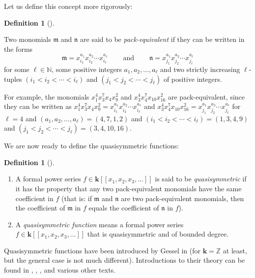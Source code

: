 \documentclass[numbers=enddot,12pt,final,onecolumn,notitlepage]{scrartcl}%
\theoremstyle{definition}
\newtheorem{defi}[theo]{Definition}
\newenvironment{definition}[1][]
{\begin{defi}[#1]\begin{leftbar}}
{\end{leftbar}\end{defi}}
\begin{document}
Let us define this concept more rigorously:

\begin{definition}
Two monomials $\mathfrak{m}$ and $\mathfrak{n}$ are said to be
\emph{pack-equivalent} if they can be written in the forms%
\[
\mathfrak{m}=x_{i_{1}}^{a_{1}}x_{i_{2}}^{a_{2}}\cdots x_{i_{\ell}}^{a_{\ell}%
}\ \ \ \ \ \ \ \ \ \ \text{and}\ \ \ \ \ \ \ \ \ \ \mathfrak{n}=x_{j_{1}%
}^{a_{1}}x_{j_{2}}^{a_{2}}\cdots x_{j_{\ell}}^{a_{\ell}}%
\]
for some $\ell\in\mathbb{N}$, some positive integers $a_{1},a_{2}%
,\ldots,a_{\ell}$ and two strictly increasing $\ell$-tuples $\left(
i_{1}<i_{2}<\cdots<i_{\ell}\right)  $ and $\left(  j_{1}<j_{2}<\cdots<j_{\ell
}\right)  $ of positive integers.
\end{definition}

For example, the monomials $x_{1}^{4}x_{3}^{7}x_{4}x_{9}^{2}$ and $x_{3}%
^{4}x_{4}^{7}x_{10}x_{16}^{2}$ are pack-equivalent, since they can be written
as $x_{1}^{4}x_{3}^{7}x_{4}x_{9}^{2}=x_{i_{1}}^{a_{1}}x_{i_{2}}^{a_{2}}\cdots
x_{i_{\ell}}^{a_{\ell}}$ and $x_{3}^{4}x_{4}^{7}x_{10}x_{16}^{2}=x_{j_{1}%
}^{a_{1}}x_{j_{2}}^{a_{2}}\cdots x_{j_{\ell}}^{a_{\ell}}$ for $\ell=4$ and
$\left(  a_{1},a_{2},\ldots,a_{\ell}\right)  =\left(  4,7,1,2\right)  $ and
$\left(  i_{1}<i_{2}<\cdots<i_{\ell}\right)  =\left(  1,3,4,9\right)  $ and
$\left(  j_{1}<j_{2}<\cdots<j_{\ell}\right)  =\left(  3,4,10,16\right)  $.

We are now ready to define the quasisymmetric functions:

\begin{definition}
\begin{enumerate}
\item[\textbf{(a)}] A formal power series $f\in\mathbf{k}\left[  \left[
x_{1},x_{2},x_{3},\ldots\right]  \right]  $ is said to be
\emph{quasisymmetric} if it has the property that any two pack-equivalent
monomials have the same coefficient in $f$ (that is: if $\mathfrak{m}$ and
$\mathfrak{n}$ are two pack-equivalent monomials, then the coefficient of
$\mathfrak{m}$ in $f$ equals the coefficient of $\mathfrak{n}$ in $f$).

\item[\textbf{(b)}] A \emph{quasisymmetric function} means a formal power
series $f\in\mathbf{k}\left[  \left[  x_{1},x_{2},x_{3},\ldots\right]
\right]  $ that is quasisymmetric and of bounded degree.
\end{enumerate}
\end{definition}

Quasisymmetric functions have been introduced by Gessel in \cite{Gessel84}
(for $\mathbf{k}=\mathbb{Z}$ at least, but the general case is not much
different). Introductions to their theory can be found in \cite[Chapters
5--6]{GriRei}, \cite[\S 7.19]{Stanley-EC2}, \cite[Chapter 8]{Sagan20},
\cite[\S 4]{Malven93} and various other texts.
\end{document}
